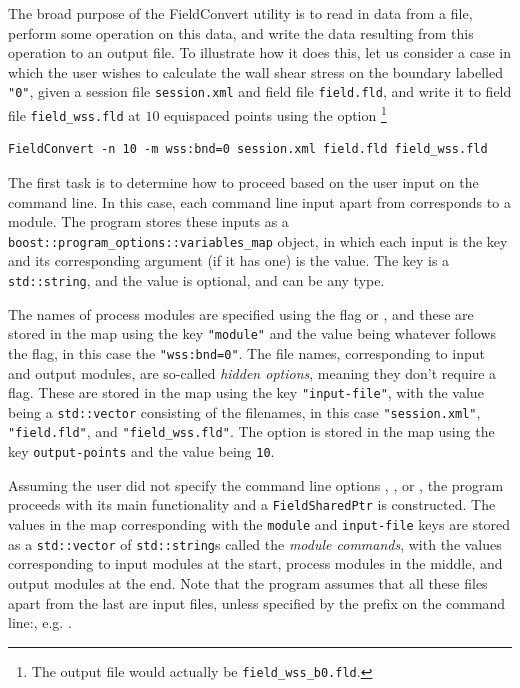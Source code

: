 The broad purpose of the FieldConvert utility is to read in data from a file, perform some operation on this data, and write the data resulting from this operation to an output file. To illustrate how it does this, let us consider a case in which the user wishes to calculate the wall shear stress on the boundary labelled \verb+"0"+, given a session file \verb+session.xml+ and field file \verb+field.fld+, and write it to field file \verb+field_wss.fld+ at $10$ equispaced points using the  option  \footnote{The output file would actually be \texttt{field\_wss\_b0.fld}.}

\begin{lstlisting}[style=BashInputStyle]
FieldConvert -n 10 -m wss:bnd=0 session.xml field.fld field_wss.fld
\end{lstlisting}

The first task is to determine how to proceed based on the user input on the command line. In this case, each command line input apart from  corresponds to a module. The program stores these inputs as a  \verb+boost::program_options::variables_map+ object, in which each input is the key and its corresponding argument (if it has one) is the value. The key is a \verb+std::string+, and the value is optional, and can be any type. 

The names of process modules are specified using the flag or , and these are stored in the map using the key \verb+"module"+ and the value being whatever follows the flag, in this case the \verb+"wss:bnd=0"+. The file names, corresponding to input and output modules, are so-called \textit{hidden options}, meaning they don't require a flag. These are stored in the map using the key \verb+"input-file"+, with the value being a \verb+std::vector+ consisting of the filenames, in this case \verb+"session.xml"+, \verb+"field.fld"+, and \verb+"field_wss.fld"+. The  option is stored in the map using the key \verb"output-points" and the value being \verb+10+.


Assuming the user did not specify the command line options , , or , the program proceeds with its main functionality and a \verb+FieldSharedPtr+ is constructed. The values in the map corresponding with the \verb+module+ and \verb+input-file+ keys are stored as a \verb+std::vector+ of \verb+std::string+s called the \textit{module commands}, with the values corresponding to input modules at the start, process modules in the middle, and output modules at the end. Note that the program assumes that all these files apart from the last are input files, unless specified by the prefix  on the command line:, e.g. .


